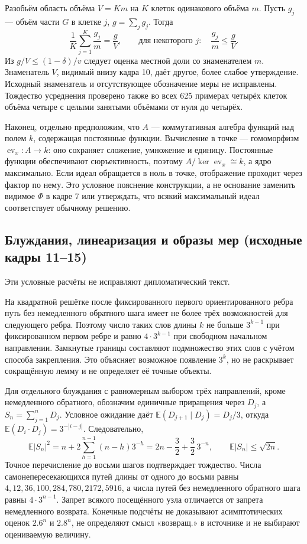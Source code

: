 \documentclass[11pt]{article}
\begin{document}
Разобьём область объёма \(V=Km\) на \(K\) клеток одинакового объёма \(m\). Пусть \(g_j\) — объём части \(G\) в клетке \(j\), \(g=\sum_jg_j\). Тогда
\[\frac1K\sum_{j=1}^K\frac{g_j}{m}=\frac gV,\qquad
 \text{для некоторого }j:\quad\frac{g_j}{m}\le\frac gV.\]
Из \(g/V\le(1-\delta)/v\) следует оценка местной доли со знаменателем \(m\). Знаменатель \(V\), видимый внизу кадра 10, даёт другое, более слабое утверждение. Исходный знаменатель и отсутствующее обозначение меры не исправлены. Тождество усреднения проверено также во всех 625 примерах четырёх клеток объёма четыре с целыми занятыми объёмами от нуля до четырёх.

Наконец, отдельно предположим, что \(A\) — коммутативная алгебра функций над полем \(k\), содержащая постоянные функции. Вычисление в точке — гомоморфизм \(\operatorname{ev}_x:A\to k\): оно сохраняет сложение, умножение и единицу. Постоянные функции обеспечивают сюръективность, поэтому \(A/\ker\operatorname{ev}_x\cong k\), а ядро максимально. Если идеал обращается в ноль в точке, отображение проходит через фактор по нему. Это условное пояснение конструкции, а не основание заменить видимое \(\Phi\) в кадре 7 или утверждать, что всякий максимальный идеал соответствует обычному решению.


\subsection*{Блуждания, линеаризация и образы мер (исходные кадры 11--15)}
Эти условные расчёты не исправляют дипломатический текст.

На квадратной решётке после фиксированного первого ориентированного ребра путь без немедленного обратного шага имеет не более трёх возможностей для следующего ребра. Поэтому число таких слов длины $k$ не больше $3^{k-1}$ при фиксированном первом ребре и равно $4\cdot3^{k-1}$ при свободном начальном направлении. Замкнутые границы составляют подмножество этих слов с учётом способа закрепления. Это объясняет возможное появление $3^k$, но не раскрывает сокращённую лемму и не определяет её точные объекты.

Для отдельного блуждания с равномерным выбором трёх направлений, кроме немедленного обратного, обозначим единичные приращения через $D_j$, а $S_n=\sum_{j=1}^nD_j$. Условное ожидание даёт $\mathbb E(D_{j+1}\mid D_j)=D_j/3$, откуда $\mathbb E(D_i\cdot D_j)=3^{-|i-j|}$. Следовательно,
\[
\mathbb E|S_n|^2=n+2\sum_{h=1}^{n-1}(n-h)3^{-h}
=2n-\frac32+\frac32\,3^{-n},\qquad
\mathbb E|S_n|\leq\sqrt{2n}.
\]
Точное перечисление до восьми шагов подтверждает тождество. Числа самонепересекающихся путей длины от одного до восьми равны $4,12,36,100,284,780,2172,5916$, а числа путей без немедленного обратного шага равны $4\cdot3^{n-1}$. Запрет всякого посещённого узла отличается от запрета немедленного возврата. Конечные подсчёты не доказывают асимптотических оценок $2.6^n$ и $2.8^n$, не определяют смысл «возвращ.» в источнике и не выбирают оцениваемую величину.
\end{document}
